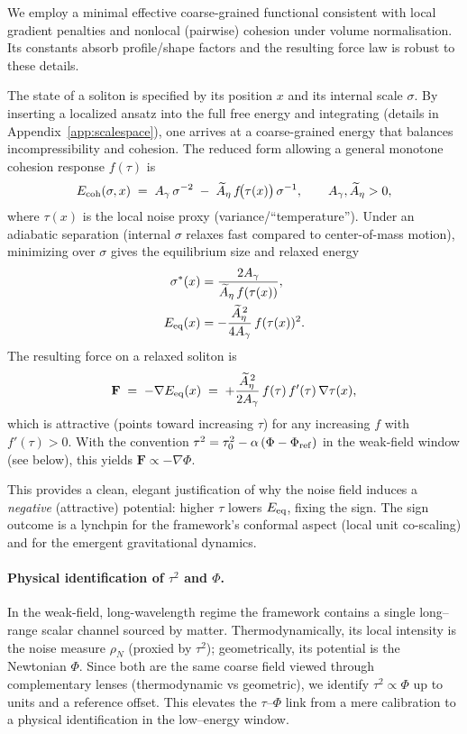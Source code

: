 \documentclass[11pt]{article}
\begin{document}
We employ a minimal effective coarse-grained functional consistent with local gradient penalties and nonlocal (pairwise) cohesion under volume normalisation. Its constants absorb profile/shape factors and the resulting force law is robust to these details.

The state of a soliton is specified by its position $x$ and its internal scale $\sigma$. By inserting a localized ansatz into the full free energy and integrating (details in Appendix~\ref{app:scalespace}), one arrives at a coarse-grained energy that balances incompressibility and cohesion. The reduced form allowing a general monotone cohesion response $f(\tau)$ is
\begin{equation}
  E_{\rm coh}(\sigma,x) \;=\; A_{\gamma}\,\sigma^{-2} \; -\; \widetilde A_{\eta}\, f\!\big(\tau(x)\big)\,\sigma^{-1},\qquad A_{\gamma},\widetilde A_{\eta}>0,
\end{equation}
where $\tau(x)$ is the local noise proxy (variance/``temperature''). Under an adiabatic separation (internal $\sigma$ relaxes fast compared to center-of-mass motion), minimizing over $\sigma$ gives the equilibrium size and relaxed energy
\begin{align}
  \sigma^*(x) &= \frac{2 A_{\gamma}}{\widetilde A_{\eta}\, f(\tau(x))},\\
  E_{\rm eq}(x) &= -\frac{\widetilde A_{\eta}^{\,2}}{4 A_{\gamma}}\, f(\tau(x))^2.
\end{align}
The resulting force on a relaxed soliton is
\begin{equation}
  \mathbf F \;=\; -\nabla E_{\rm eq}(x) \;=\; +\frac{\widetilde A_{\eta}^{\,2}}{2 A_{\gamma}}\, f(\tau)\, f'(\tau)\,\nabla\tau(x),
\end{equation}
which is attractive (points toward increasing $\tau$) for any increasing $f$ with $f'(\tau)>0$. With the convention $\tau^2=\tau_0^2-\alpha\,(\Phi-\Phi_{\rm ref})$ in the weak-field window (see below), this yields $\mathbf F \propto -\nabla\Phi$.

\noindent This provides a clean, elegant justification of why the noise field induces a \emph{negative} (attractive) potential: higher $\tau$ lowers $E_{\rm eq}$, fixing the sign. The sign outcome is a lynchpin for the framework's conformal aspect (local unit co-scaling) and for the emergent gravitational dynamics.

\paragraph{Physical identification of $\tau^2$ and $\Phi$.} In the weak-field, long-wavelength regime the framework contains a single long--range scalar channel sourced by matter. Thermodynamically, its local intensity is the noise measure $\rho_N$ (proxied by $\tau^2$); geometrically, its potential is the Newtonian $\Phi$. Since both are the same coarse field viewed through complementary lenses (thermodynamic vs geometric), we identify $\tau^2 \propto \Phi$ up to units and a reference offset. This elevates the $\tau$--$\Phi$ link from a mere calibration to a physical identification in the low--energy window.
\end{document}
